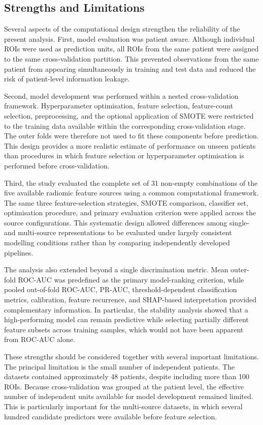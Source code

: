 \documentclass[12pt,twocolumn]{article}
\begin{document}
\subsection{Strengths and Limitations}
\label{subsec:discussion_strengths_limitations}

Several aspects of the computational design strengthen the reliability
of the present analysis. First, model evaluation was patient aware.
Although individual ROIs were used as prediction units, all ROIs from
the same patient were assigned to the same cross-validation partition.
This prevented observations from the same patient from appearing
simultaneously in training and test data and reduced the risk of
patient-level information leakage.

Second, model development was performed within a nested
cross-validation framework. Hyperparameter optimisation, feature
selection, feature-count selection, preprocessing, and the optional
application of SMOTE were restricted to the training data available
within the corresponding cross-validation stage. The outer folds were
therefore not used to fit these components before prediction. This
design provides a more realistic estimate of performance on unseen
patients than procedures in which feature selection or
hyperparameter optimisation is performed before cross-validation.

Third, the study evaluated the complete set of 31 non-empty
combinations of the five available radiomic feature sources using a
common computational framework. The same three feature-selection
strategies, SMOTE comparison, classifier set, optimisation procedure,
and primary evaluation criterion were applied across the source
configurations. This systematic design allowed differences among
single- and multi-source representations to be evaluated under
largely consistent modelling conditions rather than by comparing
independently developed pipelines.

The analysis also extended beyond a single discrimination metric.
Mean outer-fold ROC-AUC was predefined as the primary model-ranking
criterion, while pooled out-of-fold ROC-AUC, PR-AUC,
threshold-dependent classification metrics, calibration, feature
recurrence, and SHAP-based interpretation provided complementary
information. In particular, the stability analysis showed that a
high-performing model can remain predictive while selecting partially
different feature subsets across training samples, which would not
have been apparent from ROC-AUC alone.

These strengths should be considered together with several important
limitations. The principal limitation is the small number of
independent patients. The datasets contained approximately 48
patients, despite including more than 100 ROIs. Because
cross-validation was grouped at the patient level, the effective
number of independent units available for model development remained
limited. This is particularly important for the multi-source datasets,
in which several hundred candidate predictors were available before
feature selection.
\end{document}
